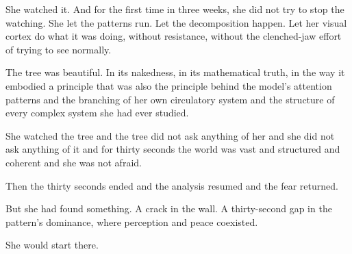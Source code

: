 She watched it. And for the first time in three weeks, she did not try to stop the watching. She let the patterns run. Let the decomposition happen. Let her visual cortex do what it was doing, without resistance, without the clenched-jaw effort of trying to see normally.

The tree was beautiful. In its nakedness, in its mathematical truth, in the way it embodied a principle that was also the principle behind the model's attention patterns and the branching of her own circulatory system and the structure of every complex system she had ever studied.

She watched the tree and the tree did not ask anything of her and she did not ask anything of it and for thirty seconds the world was vast and structured and coherent and she was not afraid.

Then the thirty seconds ended and the analysis resumed and the fear returned.

But she had found something. A crack in the wall. A thirty-second gap in the pattern's dominance, where perception and peace coexisted.

She would start there.
